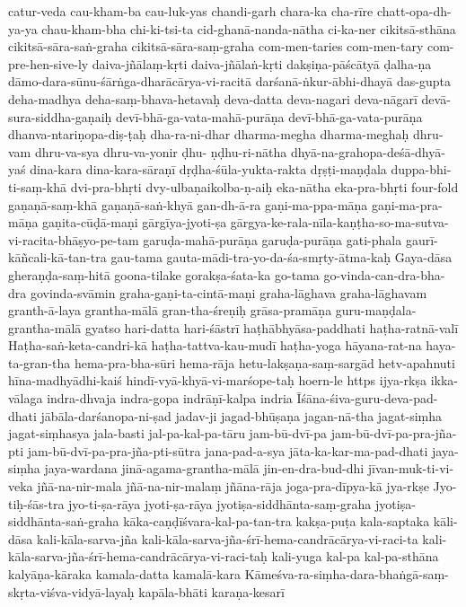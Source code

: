 {catur-veda
cau-kham-ba
cau-luk-yas
chandi-garh
chara-ka
cha-rīre
chatt-opa-dh-ya-ya
chau-kham-bha
chi-ki-tsi-ta
cid-ghanā-nanda-nātha
ci-ka-ner
cikitsā-sthāna
cikitsā-sāra-saṅ-graha 
cikitsā-sāra-saṃ-graha
com-men-taries
com-men-tary
com-pre-hen-sive-ly
daiva-jñālaṃ-kṛti
daiva-jñālaṅ-kṛti
dakṣiṇa-pāścātyā
ḍalha-ṇa
dāmo-dara-sūnu-śārṅga-dharācārya-vi-racitā
darśanā-ṅkur-ābhi-dhayā
das-gupta
deha-madhya
deha-saṃ-bhava-hetavaḥ
deva-datta
deva-nagari
deva-nāgarī
devā-sura-siddha-gaṇaiḥ
devī-bhā-ga-vata-mahā-purāṇa
devī-bhā-ga-vata-purāṇa
dhanva-ntariṇopa-diṣ-ṭaḥ
dha-ra-ni-dhar
dharma-megha
dharma-meghaḥ
dhru-vam
dhru-va-sya
dhru-va-yonir
ḍhu- ṇḍhu-ri-nātha
dhyā-na-grahopa-deśā-dhyā-yaś
dina-kara
dina-kara-sāraṇī
dṛḍha-śūla-yukta-rakta
dṛṣṭi-maṇḍala
duppa-bhi-ti-saṃ-khā
dvi-pra-bhṛti
dvy-ulbaṇaikolba-ṇ-aiḥ
eka-nātha
eka-pra-bhṛti
four-fold
gaṇaṇā-saṃ-khā
gaṇaṇā-saṅ-khyā
gan-dh-ā-ra
gaṇi-ma-ppa-māṇa
gaṇi-ma-pra-māṇa
gaṇita-cūḍā-maṇi
gārgīya-jyoti-ṣa
gārgya-ke-rala-nīla-kaṇṭha-so-ma-sutva-vi-racita-bhāṣyo-pe-tam
garuḍa-mahā-purāṇa
garuḍa-purāṇa
gati-phala
gaurī-kāñcali-kā-tan-tra
gau-tama
gauta-mādi-tra-yo-da-śa-smṛty-ātma-kaḥ
Gaya-dāsa
gheraṇḍa-saṃ-hitā
goona-tilake
gorakṣa-śata-ka
go-tama
go-vinda-can-dra-bha-dra
govinda-svāmin
graha-gaṇi-ta-cintā-maṇi
graha-lāghava
graha-lāghavam
granth-ā-laya
grantha-mālā
gran-tha-śreṇiḥ
grāsa-pramāṇa
guru-maṇḍala-grantha-mālā
gyatso
hari-datta
hari-śāstrī
haṭhābhyāsa-paddhati
haṭha-ratnā-valī
Haṭha-saṅ-keta-candri-kā
haṭha-tattva-kau-mudī
haṭha-yoga
hāyana-rat-na
haya-ta-gran-tha
hema-pra-bha-sūri
hema-rāja
hetu-lakṣaṇa-saṃ-sargād
hetv-apahnuti
hīna-madhyādhi-kaiś
hindī-vyā-khyā-vi-marśope-taḥ
hoern-le
https
ijya-rkṣa
ikka-vālaga
indra-dhvaja
indra-gopa
indrāṇī-kalpa
indria
Īśāna-śiva-guru-deva-pad-dhati
jābāla-darśanopa-ni-ṣad
jadav-ji
jagad-bhūṣaṇa
jagan-nā-tha
jagat-siṃha
jagat-siṃhasya
jala-basti
jal-pa-kal-pa-tāru
jam-bū-dvī-pa
jam-bū-dvī-pa-pra-jña-pti
jam-bū-dvī-pa-pra-jña-pti-sūtra
jana-pad-a-sya
jāta-ka-kar-ma-pad-dhati
jaya-siṃha
jaya-wardana
jinā-agama-grantha-mālā
jin-en-dra-bud-dhi
jīvan-muk-ti-vi-veka
jñā-na-nir-mala
jñā-na-nir-malaṃ
jñāna-rāja
joga-pra-dīpya-kā
jya-rkṣe
Jyo-tiḥ-śās-tra
jyo-ti-ṣa-rāya
jyoti-ṣa-rāya
jyotiṣa-siddhānta-saṃ-graha
jyotiṣa-siddhānta-saṅ-graha
kāka-caṇḍīśvara-kal-pa-tan-tra
kakṣa-puṭa
kala-saptaka
kāli-dāsa
kali-kāla-sarva-jña
kali-kāla-sarva-jña-śrī-hema-candrācārya-vi-raci-ta
kali-kāla-sarva-jña-śrī-hema-candrācārya-vi-raci-taḥ
kali-yuga
kal-pa
kal-pa-sthāna
kalyāṇa-kāraka
kamala-datta
kamalā-kara
Kāmeśva-ra-siṃha-dara-bhaṅgā-saṃ-skṛta-viśva-vidyā-layaḥ
kapāla-bhāti
karaṇa-kesarī
}
